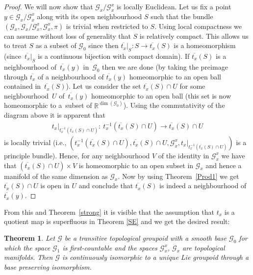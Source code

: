 \documentclass[pdftex]{sigma}
\newtheorem{tw}{Theorem}[section]
\begin{document}
\begin{proof}
We will now show that $\mathcal{G}_x\slash\mathcal{G}_x^x$ is locally Euclidean. Let us fix a point $y\in\mathcal{G}_x\slash\mathcal{G}_x^x$ along with its open neighbourhood $S$ such that the bundle $(\mathcal{G}_x,\mathcal{G}_x\slash\mathcal{G}_x^x,\mathcal{G}_x^x,\pi)$ is trivial when restricted to $S$. Using local compactness we can assume without loss of generality that $S$ is relatively compact. This allows us to treat $S$ as a subset of $\mathcal{G}_0$ since then $\overline{t_x}|_S\colon S\rightarrow\overline{t_x}(S)$ is a homeomorphism (since~$\overline{t_x}|_{\overline{S}}$ is a continuous bijection with compact domain). If $\overline{t_x}(S)$ is a neighbourhood of~$\overline{t_x}(y)$ in~$\mathcal{G}_0$ then we are done (by taking the preimage through $\overline{t_x}$ of a neighbourhood of $\overline{t_x}(y)$ homeomorphic to an open ball contained in~$\overline{t_x}(S)$). Let us consider the set $\overline{t_x}(S)\cap U$ for some neighbourhood~$U$ of~$\overline{t_x}(y)$ homeomorphic to an open ball (this set is now homeomorphic to a~subset of $\mathbb{R}^{\dim(\mathcal{G}_0)}$). Using the commutativity of the diagram above it is apparent that
\begin{gather*}
t_x|_{t_x^{-1}(\overline{t_x}(S)\cap U)}\colon \ t_x^{-1}(\overline{t_x}(S)\cap U)\rightarrow \overline{t_x}(S)\cap U
\end{gather*}
is locally trivial (i.e., $(t_x^{-1}(\overline{t_x}(S)\cap U),\overline{t_x}(S)\cap U,\mathcal{G}^x_x,t_x|_{t_x^{-1}(\overline{t_x}(S)\cap U)})$ is a principle bundle). Hence, for any neighbourhood $V$ of the identity in $\mathcal{G}^x_x$ we have that $(\overline{t_x}(S)\cap U)\times V$ is homeomorphic to an open subset in $\mathcal{G}_x$ and hence a manifold of the same dimension as $\mathcal{G}_x$. Now by using Theorem~\ref{Prod1} we get $\overline{t_x}(S)\cap U$ is open in $U$ and conclude that $\overline{t_x}(S)$ is indeed a neighbourhood of $\overline{t_x}(y)$.
\end{proof}

From this and Theorem~\ref{strong} it is visible that the assumption that $t_x$ is a quotient map is superfluous in Theorem \ref{SE} and we get the desired result:
\begin{tw}\label{H5S} Let $\mathcal{G}$ be a transitive topological groupoid with a smooth base $\mathcal{G}_0$ for which the space $\mathcal{G}_1$ is first-countable and the spaces $\mathcal{G}_x^x$, $\mathcal{G}_x$ are topological manifolds. Then $\mathcal{G}$ is continuously isomorphic to a unique Lie groupoid through a base preserving isomorphism.
\end{tw}
\end{document}
